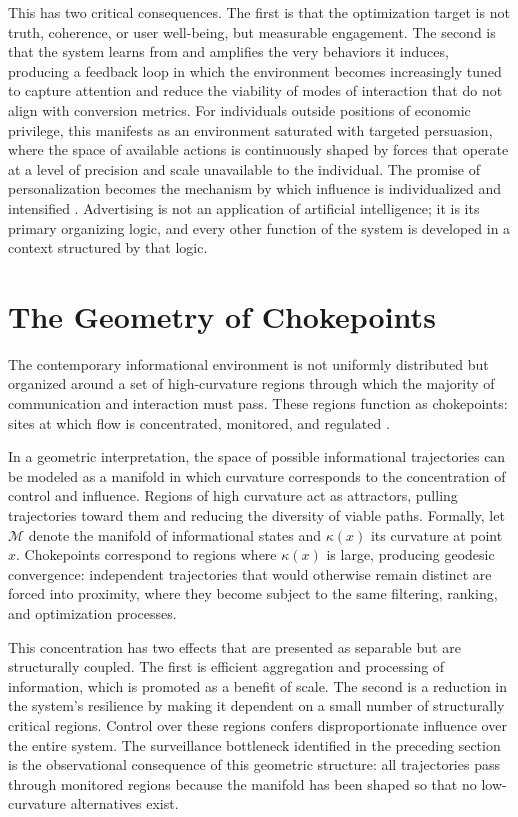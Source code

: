 \documentclass[12pt, a4paper]{article}
\begin{document}
This has two critical consequences. The first is that the optimization target is not truth, coherence, or user well-being, but measurable engagement. The second is that the system learns from and amplifies the very behaviors it induces, producing a feedback loop in which the environment becomes increasingly tuned to capture attention and reduce the viability of modes of interaction that do not align with conversion metrics. For individuals outside positions of economic privilege, this manifests as an environment saturated with targeted persuasion, where the space of available actions is continuously shaped by forces that operate at a level of precision and scale unavailable to the individual. The promise of personalization becomes the mechanism by which influence is individualized and intensified \cite{Zuboff2019}. Advertising is not an application of artificial intelligence; it is its primary organizing logic, and every other function of the system is developed in a context structured by that logic.

\section{The Geometry of Chokepoints}

The contemporary informational environment is not uniformly distributed but organized around a set of high-curvature regions through which the majority of communication and interaction must pass. These regions function as chokepoints: sites at which flow is concentrated, monitored, and regulated \cite{Wiener1948}.

In a geometric interpretation, the space of possible informational trajectories can be modeled as a manifold in which curvature corresponds to the concentration of control and influence. Regions of high curvature act as attractors, pulling trajectories toward them and reducing the diversity of viable paths. Formally, let $\mathcal{M}$ denote the manifold of informational states and $\kappa(x)$ its curvature at point $x$. Chokepoints correspond to regions where $\kappa(x)$ is large, producing geodesic convergence: independent trajectories that would otherwise remain distinct are forced into proximity, where they become subject to the same filtering, ranking, and optimization processes.

This concentration has two effects that are presented as separable but are structurally coupled. The first is efficient aggregation and processing of information, which is promoted as a benefit of scale. The second is a reduction in the system's resilience by making it dependent on a small number of structurally critical regions. Control over these regions confers disproportionate influence over the entire system. The surveillance bottleneck identified in the preceding section is the observational consequence of this geometric structure: all trajectories pass through monitored regions because the manifold has been shaped so that no low-curvature alternatives exist.
\end{document}
